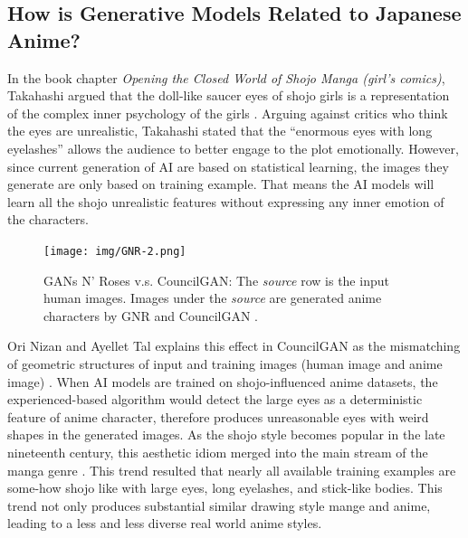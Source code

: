 \subsection*{How is Generative Models Related to Japanese Anime?}

In the book chapter {\it Opening the Closed World of Shojo Manga (girl's comics)},
Takahashi argued that the doll-like saucer eyes of shojo girls is a representation
of the complex inner psychology of the girls \cite{takahashi2008shojo}.
Arguing against critics who think the eyes are unrealistic,
Takahashi stated that the ``enormous eyes with long eyelashes''
allows the audience to better engage to the plot emotionally.
However, since current generation of AI are based on statistical learning,
the images they generate are only based on training example.
That means the AI models will learn all the shojo unrealistic features
without expressing any inner emotion of the characters.
\begin{figure}[h]
    \texttt{[image: img/GNR-2.png]}
    \caption{
        GANs N' Roses v.s. CouncilGAN: The {\it source} row is the input human images.
        Images under the {\it source} are generated anime characters by GNR and CouncilGAN
        \cite{chong2021gans}.
    }
\end{figure}

Ori Nizan and Ayellet Tal explains this effect in CouncilGAN as
the mismatching of geometric structures of input and training images (human image and anime image) \cite{nizan2020council}.
When AI models are trained on shojo-influenced anime datasets,
the experienced-based algorithm would detect the large eyes as a deterministic feature
of anime character,
therefore produces unreasonable eyes with weird shapes in the generated images.
As the shojo style becomes popular in the late nineteenth century,
this aesthetic idiom merged into the main stream of the manga genre \cite{takahashi2008shojo}.
This trend resulted that nearly all available training examples are some-how shojo like with large eyes, long eyelashes, and stick-like bodies.
This trend not only produces substantial similar drawing style mange and anime,
leading to a less and less diverse real world anime styles.

